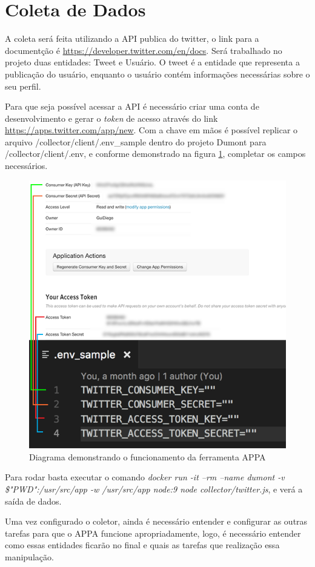 \section{Coleta de Dados}
A coleta será feita utilizando a API publica do twitter, o link para a documentção é \url{https://developer.twitter.com/en/docs}. Será trabalhado no projeto duas entidades: Tweet e Usuário. O tweet é a entidade que representa a publicação do usuário, enquanto o usuário contém informações necessárias sobre o seu perfil.

Para que seja possível acessar a API é necessário criar uma conta de desenvolvimento e gerar o \textit{token} de acesso através do link \url{https://apps.twitter.com/app/new}. Com a chave em mãos é possível replicar o arquivo /collector/client/.env\_sample dentro do projeto Dumont para /collector/client/.env, e conforme demonstrado na figura \ref{fig:twitteropts}, completar os campos necessários.

\begin{figure}
    \centering
    \includegraphics[width=.8\textwidth]{imagens/twitteropts.png}
    \caption{Diagrama demonstrando o funcionamento da ferramenta APPA}
    \label{fig:twitteropts}
\end{figure}

Para rodar basta executar o comando \textit{docker run -it --rm --name dumont -v \$"PWD":/usr/src/app -w /usr/src/app node:9 node collector/twitter.js}, e verá a saída de dados.

Uma vez configurado o coletor, ainda é necessário entender e configurar as outras tarefas para que o APPA funcione apropriadamente, logo, é necessário entender como essas entidades ficarão no final e quais as tarefas que realização essa manipulação.

